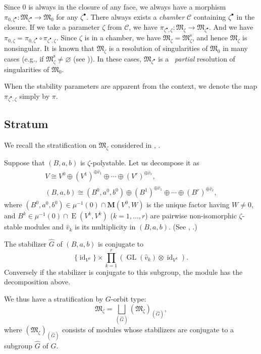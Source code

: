 \documentclass[11pt]{article}
\theoremstyle{definition}
\numberwithin{equation}{section}
\newcommand{\GL}{\operatorname{GL}}
\newcommand{\id}{\operatorname{id}}
\newcommand{\bM}{{\mathbf M}} %
\newcommand{\M}{{\mathfrak M}} %
\newcommand{\Mreg}{\M^{\operatorname{s}}}
\newcommand{\HomE}{\operatorname{E}}
\begin{document}
Since $0$ is always in the closure of any face, we always have a
morphism
\(
  \pi_{0,\zeta^\bullet}\colon \M_{\zeta^\bullet}\to \M_0
\)
for any $\zeta^\bullet$. There always exists a {\it chamber\/} $\mathcal C$
containing $\zeta^\bullet$ in the closure. If we take a parameter $\zeta$
from $\mathcal C$, we have
\(
  \pi_{\zeta^\bullet,\zeta}\colon \M_{\zeta}\to \M_{\zeta^\bullet}.
\)
And we have $\pi_{0,\zeta} =
\pi_{0,\zeta^\bullet}\circ\pi_{\zeta^\bullet,\zeta}$. Since
$\zeta$ is in a chamber, we have $\M_{\zeta} = \Mreg_{\zeta}$, and
hence $\M_{\zeta}$ is nonsingular. It is known that
$\M_{\zeta}$ is a resolution of singularities of $\M_0$ in many cases
(e.g., if $\Mreg_{\zeta}\neq\varnothing$ (see
\cite[Theorem~4.1]{Na-quiver})). In these cases, $\M_{\zeta^\bullet}$ is a~{\it
  partial} resolution of singularities of $\M_0$.

When the stability parameters are apparent from the context, we denote
the map $\pi_{\zeta^\bullet,\zeta}$ simply by $\pi$.

\subsection{Stratum}\label{subsec:stratum}

We recall the stratif\/ication on $\M_\zeta$ considered in
\cite[Section~6]{Na-quiver}, \cite[Section~3]{Na-alg}.

Suppose that $(B,a,b)$ is $\zeta$-polystable. Let us decompose it as
\begin{gather}
     V \cong V^0 \oplus (V^1)^{\oplus {\widehat v}_1}\oplus \cdots \oplus
   (V^r)^{\oplus {\widehat v}_r},
\nonumber\\
     (B,a,b) \cong (B^0,a^0,b^0) \oplus
   (B^1)^{\oplus {\widehat v}_1} \oplus \cdots \oplus
   (B^r)^{\oplus {\widehat v}_r},\label{eq:decomp}
\end{gather}
where $(B^0,a^0,b^0)\in\mu^{-1}(0)\cap\bM(V^0,W)$ is the unique factor
having $W\neq 0$, and $B^k\in \mu^{-1}(0)\cap\HomE(V^k,V^k)$
($k=1,\dots,r$) are pairwise non-isomorphic $\zeta$-stable modules
and ${\widehat v}_k$ is its multiplicity in $(B,a,b)$. (See
\cite[6.5]{Na-quiver}, \cite[3.27]{Na-alg}.)

The stabilizer $\widehat G$ of $(B,a,b)$ is conjugate to
\[
   \{ \id_{V^0} \} \times
   \prod_{k=1}^r \left(\GL(\widehat{v}_k)\otimes \id_{V^k}\right).
\]
Conversely if the stabilizer is conjugate to this subgroup, the module
has the decomposition above.

We thus have a stratif\/ication by $G$-orbit type:
\begin{equation*}
   \M_\zeta = \bigsqcup_{(\widehat G)} (\M_\zeta)_{(\widehat G)},
\end{equation*}
where $(\M_\zeta)_{(\widehat G)}$ consists of modules whose
stabilizers are conjugate to a subgroup $\widehat G$ of $G$.
\end{document}
